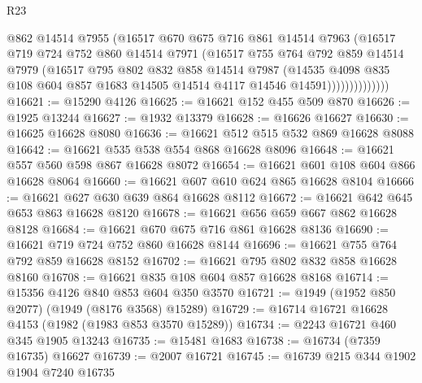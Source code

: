 \begin{lexlean}{R23}
\begin{coremodule}
                      @862
                      @14514
                      @7955
                      (@16517
                        @670
                        @675
                        @716
                        @861
                        @14514
                        @7963
                        (@16517
                          @719
                          @724
                          @752
                          @860
                          @14514
                          @7971
                          (@16517
                            @755
                            @764
                            @792
                            @859
                            @14514
                            @7979
                            (@16517
                              @795
                              @802
                              @832
                              @858
                              @14514
                              @7987
                              (@14535
                                @4098
                                @835
                                @108
                                @604
                                @857
                                @1683
                                @14505
                                @14514
                                @4117
                                @14546
                                @14591))))))))))))))
@16621 := @15290 @4126
@16625 := @16621 @152 @455 @509 @870
@16626 := @1925 @13244
@16627 := @1932 @13379
@16628 := @16626 @16627
@16630 := @16625 @16628 @8080
@16636 := @16621 @512 @515 @532 @869 @16628 @8088
@16642 := @16621 @535 @538 @554 @868 @16628 @8096
@16648 := @16621 @557 @560 @598 @867 @16628 @8072
@16654 := @16621 @601 @108 @604 @866 @16628 @8064
@16660 := @16621 @607 @610 @624 @865 @16628 @8104
@16666 := @16621 @627 @630 @639 @864 @16628 @8112
@16672 := @16621 @642 @645 @653 @863 @16628 @8120
@16678 := @16621 @656 @659 @667 @862 @16628 @8128
@16684 := @16621 @670 @675 @716 @861 @16628 @8136
@16690 := @16621 @719 @724 @752 @860 @16628 @8144
@16696 := @16621 @755 @764 @792 @859 @16628 @8152
@16702 := @16621 @795 @802 @832 @858 @16628 @8160
@16708 := @16621 @835 @108 @604 @857 @16628 @8168
@16714 := @15356 @4126 @840 @853 @604 @350 @3570
@16721 := @1949 (@1952 @850 @2077) (@1949 (@8176 @3568) @15289)
@16729 := @16714 @16721 @16628 @4153 (@1982 (@1983 @853 @3570 @15289))
@16734 := @2243 @16721 @460 @345 @1905 @13243
@16735 := @15481 @1683
@16738 := @16734 (@7359 @16735) @16627
@16739 := @2007 @16721
@16745 := @16739 @215 @344 @1902 @1904 @7240 @16735

\end{coremodule}
\end{lexlean}
